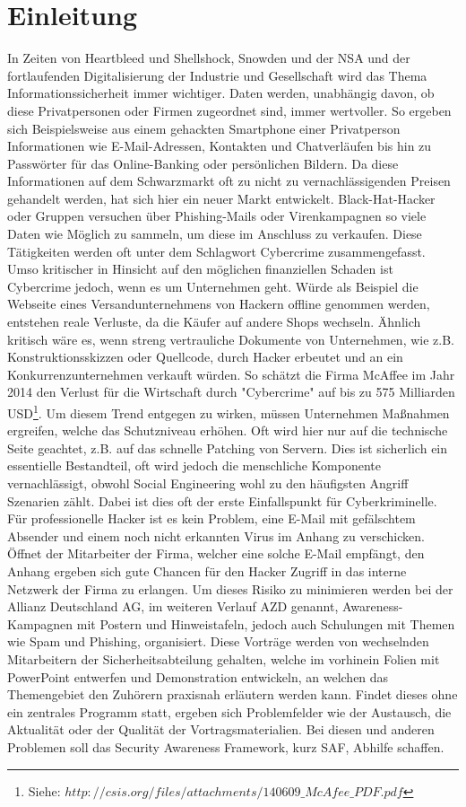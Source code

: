 \chapter{Einleitung}
In Zeiten von Heartbleed und Shellshock, Snowden und der NSA und der fortlaufenden Digitalisierung der Industrie und Gesellschaft wird das Thema Informationssicherheit immer wichtiger. Daten werden, unabhängig davon, ob diese Privatpersonen oder Firmen zugeordnet sind, immer wertvoller. So ergeben sich Beispielsweise aus einem gehackten Smartphone einer Privatperson Informationen wie E-Mail-Adressen, Kontakten und Chatverläufen bis hin zu Passwörter für das Online-Banking oder persönlichen Bildern. Da diese Informationen auf dem Schwarzmarkt oft zu nicht zu vernachlässigenden Preisen gehandelt werden, hat sich hier ein neuer Markt entwickelt. Black-Hat-Hacker oder Gruppen versuchen über Phishing-Mails oder Virenkampagnen so viele Daten wie Möglich zu sammeln, um diese im Anschluss zu verkaufen. Diese Tätigkeiten werden oft unter dem Schlagwort Cybercrime zusammengefasst. Umso kritischer in Hinsicht auf den möglichen finanziellen Schaden ist Cybercrime jedoch, wenn es um Unternehmen geht. Würde als Beispiel die Webseite eines Versandunternehmens von Hackern offline genommen werden, entstehen reale Verluste, da die Käufer auf andere Shops wechseln. Ähnlich kritisch wäre es, wenn streng vertrauliche Dokumente von Unternehmen, wie z.B. Konstruktionsskizzen oder Quellcode, durch Hacker erbeutet und an ein Konkurrenzunternehmen verkauft würden. So schätzt die Firma McAffee im Jahr 2014 den Verlust für die Wirtschaft durch "Cybercrime" auf bis zu 575 Milliarden USD\footnote{Siehe: $http://csis.org/files/attachments/140609\_McAfee\_PDF.pdf$}. 
Um diesem Trend entgegen zu wirken, müssen Unternehmen Maßnahmen ergreifen, welche das Schutzniveau erhöhen. Oft wird hier nur auf die technische Seite geachtet, z.B. auf das schnelle Patching von Servern. Dies ist sicherlich ein essentielle Bestandteil, oft wird jedoch die menschliche Komponente vernachlässigt, obwohl Social Engineering wohl zu den häufigsten Angriff Szenarien zählt. Dabei ist dies oft der erste Einfallspunkt für Cyberkriminelle. Für professionelle Hacker ist es kein Problem, eine E-Mail mit gefälschtem Absender und einem noch nicht erkannten Virus im Anhang zu verschicken. Öffnet der Mitarbeiter der Firma, welcher eine solche E-Mail empfängt, den Anhang ergeben sich gute Chancen für den Hacker Zugriff in das interne Netzwerk der Firma zu erlangen. Um dieses Risiko zu minimieren werden bei der Allianz Deutschland AG, im weiteren Verlauf AZD genannt, Awareness-Kampagnen mit Postern und Hinweistafeln, jedoch auch Schulungen mit Themen wie Spam und Phishing, organisiert. Diese Vorträge werden von wechselnden Mitarbeitern der Sicherheitsabteilung gehalten, welche im vorhinein Folien mit PowerPoint entwerfen und Demonstration entwickeln, an welchen das Themengebiet den Zuhörern praxisnah erläutern werden kann. Findet dieses ohne ein zentrales Programm statt, ergeben sich Problemfelder wie der Austausch, die Aktualität oder der Qualität der Vortragsmaterialien. Bei diesen und anderen Problemen soll das Security Awareness Framework, kurz SAF, Abhilfe schaffen.
